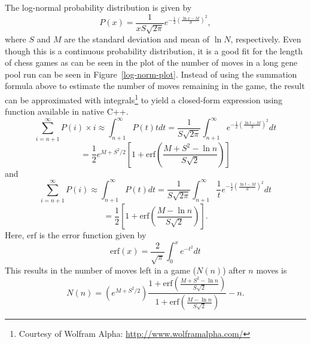 \documentclass[letterpaper]{article}
\newcommand{\cpp}{C{\nobreak +}{\nobreak +}}
\renewcommand{\_}{\allowbreak\textunderscore\allowbreak}
\begin{document}
The log-normal probability distribution is given by
\[P(x) = \frac{1}{xS\sqrt{2\pi}} e^{-\frac{1}{2}\left(\frac{\ln{x} - M}{S}\right)^2},\]
where \(S\) and \(M\) are the standard deviation and mean of \(\ln{N}\), respectively. Even though this is a continuous probability distribution, it is a good fit for the length of chess games as can be seen in the plot of the number of moves in a long gene pool run can be seen in Figure~\ref{log-norm-plot}. Instead of using the summation formula above to estimate the number of moves remaining in the game, the result can be approximated with integrals\footnote{Courtesy of Wolfram Alpha: \url{http://www.wolframalpha.com/}} to yield a closed-form expression using function available in native \cpp.
\[
\sum_{i = n + 1}^\infty P(i)\times{}i \approx \int_{n+1}^\infty P(t)tdt = \frac{1}{S\sqrt{2\pi}} \int_{n+1}^\infty e^{-\frac{1}{2}\left(\frac{\ln{t} - M}{S}\right)^2}dt
\]
\[
= \frac{1}{2}e^{M + S^2/2}\left[1 + \textrm{erf}\left(\frac{M + S^2 - \ln n}{S\sqrt{2}}\right)\right]
\]
and
\[
\sum_{i = n + 1}^\infty P(i) \approx \int_{n+1}^\infty P(t)dt = \frac{1}{S\sqrt{2\pi}} \int_{n+1}^\infty \frac{1}{t} e^{-\frac{1}{2}\left(\frac{\ln{t} - M}{S}\right)^2}dt
\]
\[
= \frac{1}{2}\left[1 + \textrm{erf}\left(\frac{M-\ln n}{S\sqrt{2}}\right)\right].
\]
Here, \(\textrm{erf}\) is the error function given by
\[
\textrm{erf}(x) = \frac{2}{\sqrt{\pi}}\int_0^x e^{-t^2}dt
\]
This results in the number of moves left in a game (\(N(n)\)) after \(n\) moves is
\[
N(n) = \left(e^{M + S^2/2}\right) \frac
{1 + \textrm{erf}\left(\frac{M + S^2 - \ln n}{S\sqrt{2}}\right)}
{1 + \textrm{erf}\left(\frac{M-\ln n}{S\sqrt{2}}\right)}
- n.
\]
\end{document}
